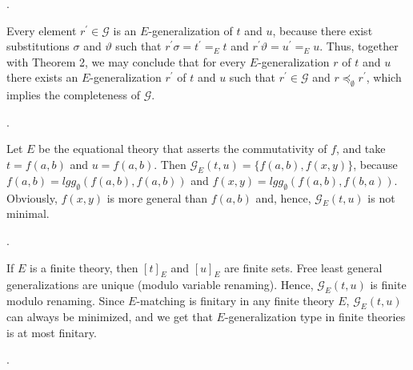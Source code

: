 \documentclass[10pt,a4paper]{amsart}
\begin{document}
  
\par{}. 
 
Every element $r^{\prime}\in\mathcal{G}$ is an $E$-generalization of $t$ and $u$, because there exist substitutions $\sigma$ and $\vartheta$ such that $r^{\prime}\sigma=t^{\prime}=_{E}t$ and $r^{\prime}\vartheta=u^{\prime}=_{E}u$. Thus, together with Theorem 2, we may conclude that for every $E$-generalization $r$ of $t$ and $u$ there exists an $E$-generalization $r^{\prime}$ of $t$ and $u$ such that $r^{\prime}\in\mathcal{G}$ and $r\preceq_{\emptyset}r^{\prime}$, which implies the completeness of $\mathcal{G}$.\par
 
 
 
\par{}. 
 
Let $E$ be the equational theory that asserts the commutativity of $f$, and take $t=f(a,b)$ and $u=f(a,b)$. Then $\mathcal{G}_{E}(t,u)=\{f(a,b),f(x,y)\}$, because $f(a,b)=\mathit{lgg}_{\emptyset}(f(a,b),f(a,b))$ and $f(x,y)=\mathit{lgg}_{\emptyset}(f(a,b),f(b,a))$. Obviously, $f(x,y)$ is more general than $f(a,b)$ and, hence, $\mathcal{G}_{E}(t,u)$ is not minimal.\par
 
 
 
\par{}. 
 
If $E$ is a finite theory, then $[t]_{E}$ and $[u]_{E}$ are finite sets. Free least general generalizations are unique (modulo variable renaming). Hence, $\mathcal{G}_{E}(t,u)$ is finite modulo renaming. Since $E$-matching is finitary in any finite theory $E$, $\mathcal{G}_{E}(t,u)$ can always be minimized, and we get that $E$-generalization type in finite theories is at most finitary.\par
 
 
 
\par{}. 
 
\end{document}
